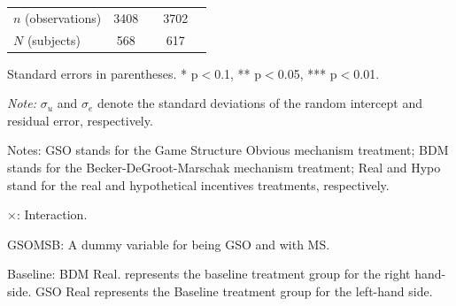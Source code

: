 \documentclass[12pt]{article}
\begin{document}
\begin{table}[H]
{\begin{tabular}{l*{2}{cc}}
\(n\) (observations)      &        3408         &            &        3702         &            \\
\(N\) (subjects)      &        568         &            &        617         &            \\
\end{tabular}
}



\begin{tablenotes}
            \footnotesize
            \item Standard errors in parentheses. * p$<$0.1, ** p$<$0.05, *** p$<$0.01.
            \item \textit{Note:} $\sigma_u$ and $\sigma_e$ denote the standard deviations of the random intercept and residual error, respectively.
            \item Notes: GSO stands for the Game Structure Obvious mechanism treatment; BDM stands for the Becker-DeGroot-Marschak mechanism treatment; Real and Hypo stand for the real and hypothetical incentives treatments, respectively.
           \item $\times$: Interaction.
           \item GSOMSB: A dummy variable for being GSO and with MS.
           \item Baseline: BDM Real. represents the baseline treatment group for the right hand-side.
           GSO Real represents the Baseline treatment group for the left-hand side.
        \end{tablenotes}
\end{table}





\clearpage






\clearpage


    \begin{table}[htbp!]
        \centering
        \caption{Two-Sample Test of Proportions (complexity above median)}
        \label{tab:Appendix_proportion_test}
    \end{table}
\end{document}
